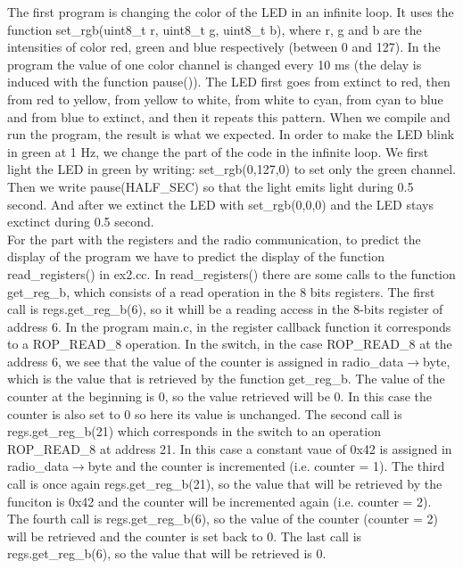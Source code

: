\documentclass[11pt]{article}
\begin{document}
The first program is changing the color of the LED in an infinite loop. It uses the function set\_rgb(uint8\_t r, uint8\_t g, uint8\_t b), where r, g and b are the intensities of color red, green and blue respectively (between 0 and 127). In the program the value of one color channel is changed every 10 ms (the delay is induced with the function pause()). The LED first goes from extinct to red, then from red to yellow, from yellow to white, from white to cyan, from cyan to blue and from blue to extinct, and then it repeats this pattern. When we compile and run the program, the result is what we expected. In order to make the LED blink in green at 1 Hz, we change the part of the code in the infinite loop. We first light the LED in green by writing: set\_rgb(0,127,0) to set only the green channel. Then we write pause(HALF\_SEC) so that the light emits light during 0.5 second. And after we extinct the LED with set\_rgb(0,0,0) and the LED stays exctinct during 0.5 second.
\\
For the part with the registers and the radio communication, to predict the display of the program we have to predict the display of the function read\_registers() in ex2.cc. In read\_registers() there are some calls to the function get\_reg\_b, which consists of a read operation in the 8 bits registers. The first call is regs.get\_reg\_b(6), so it whill be a reading access in the 8-bits register of address 6. In the program main.c, in the register callback function it corresponds to a ROP\_READ\_8 operation. In the switch, in the case ROP\_READ\_8 at the address 6, we see that the value of the counter is assigned in radio\_data${\rightarrow}$byte, which is the value that is retrieved by the function get\_reg\_b. The value of the counter at the beginning is 0, so the value retrieved will be 0. In this case the counter is also set to 0 so here its value is unchanged. The second call is regs.get\_reg\_b(21) which corresponds in the switch to an operation ROP\_READ\_8 at address 21. In this case a constant vaue of 0x42 is assigned in radio\_data${\rightarrow}$byte and the counter is incremented (i.e. counter = 1). The third call is once again regs.get\_reg\_b(21), so the value that will be retrieved by the funciton is 0x42 and the counter will be incremented again (i.e. counter = 2). The fourth call is regs.get\_reg\_b(6), so the value of the counter (counter = 2) will be retrieved and the counter is set back to 0. The last call is regs.get\_reg\_b(6), so the value that will be retrieved is 0.
\end{document}
